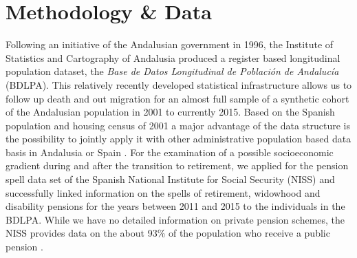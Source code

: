 \documentclass[a4paper,10pt,oneside,english]{article}
\begin{document}
\section*{\textsf{Methodology \& Data}}
Following an initiative of the Andalusian government in 1996, the Institute of Statistics and Cartography of Andalusia produced a register based longitudinal population dataset, the \textit{Base de Datos Longitudinal de Poblaci\'{o}n de Andaluc\'{i}a} (BDLPA). This relatively recently developed statistical infrastructure allows us to follow up death and out migration for an almost full sample of a synthetic cohort of the Andalusian population in 2001 to currently 2015. Based on the Spanish population and housing census of 2001 a major advantage of the data structure is the possibility to jointly apply it with other administrative population based data basis in Andalusia or Spain \citep{RN8}. For the examination of a possible socioeconomic gradient during and after the transition to retirement, we applied for the pension spell data set of the Spanish National Institute for Social Security (NISS) \citep{RN8b} and successfully linked information on the spells of retirement, widowhood and disability pensions for the years between 2011 and 2015 to the individuals in the BDLPA. While we have no detailed information on private pension schemes, the NISS provides data on the about 93\% of the population who receive a public pension \citep{RN215}.
\end{document}
